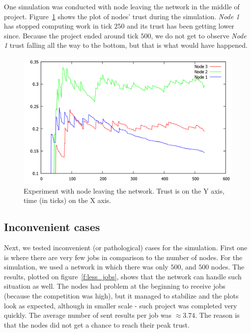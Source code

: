 One simulation was conducted with node leaving the network in the middle of project. Figure~\ref{f:trust_leave} shows the plot of nodes' trust during the simulation. \emph{Node 1} has stopped computing work in tick $250$ and its trust has been getting lower since. Because the project ended around tick $500$, we do not get to observe \emph{Node 1} trust falling all the way to the bottom, but that is what would have happened.

\begin{figure}
\centering
\includegraphics[width=\textwidth]{diagrams/trust_leave.png}
\caption{Experiment with node leaving the network. Trust is on the Y axis, time (in ticks) on the X axis.}
\label{f:trust_leave}
\end{figure}

\FloatBarrier

\subsection{Inconvenient cases}

Next, we tested inconvenient (or pathological) cases for the simulation. First one is where there are very few jobs in comparison to the number of nodes. For the simulation, we used a network in which there was only $500$, and $500$ nodes. The results, plotted on figure~\ref{f:less_jobs}, shows that the network can handle such situation as well. The nodes had problem at the beginning to receive jobs (because the competition was high), but it managed to stabilize and the plots look as expected, although in smaller scale - such project was completed very quickly. The average number of sent results per job was $\approx 3.74$. The reason is that the nodes did not get a chance to reach their peak trust.

